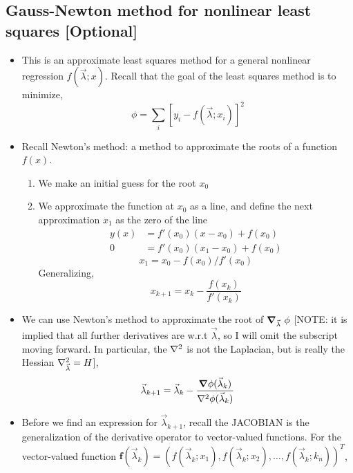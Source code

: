 \documentclass[12pt]{article}
\numberwithin{equation}{section}
\begin{document}
\subsection{Gauss-Newton method for nonlinear least squares [Optional]}
\begin{itemize}
	\item This is an approximate least squares method for a general nonlinear regression $ f(\vec{\lambda}; x) $. Recall that the goal of the least squares method is to minimize,
	\begin{equation}
			\phi = \sum_i [y_i - f(\vec{\lambda};x_i)]^2
	\end{equation}
	\item Recall Newton's method: a method to approximate the roots of a function $ f(x) $.
\begin{enumerate}
	\item We make an initial guess for the root $ x_0 $
	\item We approximate the function at $ x_0 $ as a line, and define the next approximation $ x_1 $ as the zero of the line
	\begin{align}
			y(x) &= f'(x_0)(x-x_0) + f(x_0)\\
			0 &= f'(x_0)(x_1-x_0) + f(x_0)
	\end{align}
	\begin{equation}
			x_1 = x_0 - f(x_0)/f'(x_0)
	\end{equation}
Generalizing,
\begin{equation}
			x_{k+1} = x_k -  \frac{f(x_k)}{f'(x_k)}
\end{equation}
\end{enumerate}
\item We can use Newton's method to approximate the root of  $ \grad_{\vec{\lambda}}\  \phi $ [NOTE: it is implied that all further derivatives are w.r.t $\vec{\lambda}$, so I will omit the subscript moving forward. In particular, the $ \laplacian $ is not the Laplacian, but is really the Hessian $ \laplacian_{\vec{\lambda}} = H $],
\begin{equation}
		\vec{\lambda}_{k+1} = 	\vec{\lambda}_{k} - \frac{\grad\phi(\vec{\lambda}_k)}{\laplacian\phi(\vec{\lambda}_k)} 
\end{equation}
\item Before we find an expression for $ \vec{\lambda}_{k+1}  $, recall the JACOBIAN is the generalization of the derivative operator to vector-valued functions. For the vector-valued function $ \mathbf{f}(\vec{\lambda}_k) = \left(f(\vec{\lambda}_k; x_1), f(\vec{\lambda}_k; x_2), \dots, f(\vec{\lambda}_k; k_n)\right)^T$,

\end{itemize}
\end{document}
